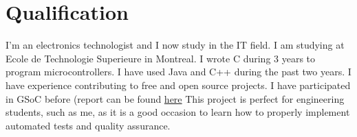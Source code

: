 \documentclass{article}
\begin{document}
\section{Qualification}
I'm an electronics technologist and I now study  in the IT field. I am studying at Ecole de Technologie Superieure in Montreal. I wrote C during 3 years to program microcontrollers. I have used Java and C++ during the past two years. I have experience contributing to free and open source projects. I have participated in GSoC before (report can be found
\href{https://gasuleg.github.io/gsoc2016/final\_report/2016/08/19/Final-Evaluation.html}{here}
This project is perfect for engineering students, such as me, as it is a good occasion to learn how to properly implement automated tests and quality assurance.
\end{document}

